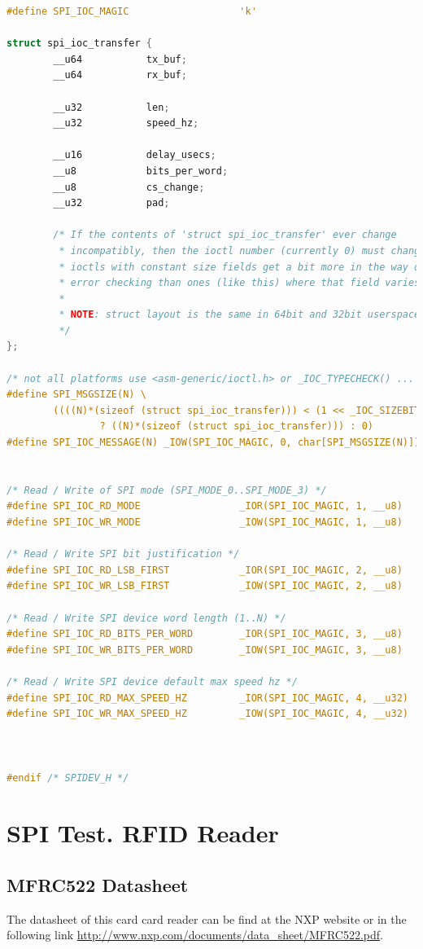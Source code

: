 \begin{lstlisting}[language=C, caption={linux/spi/spidev.h}]
#define SPI_IOC_MAGIC                   'k'

struct spi_ioc_transfer {
        __u64           tx_buf;
        __u64           rx_buf;

        __u32           len;
        __u32           speed_hz;

        __u16           delay_usecs;
        __u8            bits_per_word;
        __u8            cs_change;
        __u32           pad;

        /* If the contents of 'struct spi_ioc_transfer' ever change
         * incompatibly, then the ioctl number (currently 0) must change;
         * ioctls with constant size fields get a bit more in the way of
         * error checking than ones (like this) where that field varies.
         *
         * NOTE: struct layout is the same in 64bit and 32bit userspace.
         */
};

/* not all platforms use <asm-generic/ioctl.h> or _IOC_TYPECHECK() ... */
#define SPI_MSGSIZE(N) \
        ((((N)*(sizeof (struct spi_ioc_transfer))) < (1 << _IOC_SIZEBITS)) \
                ? ((N)*(sizeof (struct spi_ioc_transfer))) : 0)
#define SPI_IOC_MESSAGE(N) _IOW(SPI_IOC_MAGIC, 0, char[SPI_MSGSIZE(N)])


/* Read / Write of SPI mode (SPI_MODE_0..SPI_MODE_3) */
#define SPI_IOC_RD_MODE                 _IOR(SPI_IOC_MAGIC, 1, __u8)
#define SPI_IOC_WR_MODE                 _IOW(SPI_IOC_MAGIC, 1, __u8)

/* Read / Write SPI bit justification */
#define SPI_IOC_RD_LSB_FIRST            _IOR(SPI_IOC_MAGIC, 2, __u8)
#define SPI_IOC_WR_LSB_FIRST            _IOW(SPI_IOC_MAGIC, 2, __u8)

/* Read / Write SPI device word length (1..N) */
#define SPI_IOC_RD_BITS_PER_WORD        _IOR(SPI_IOC_MAGIC, 3, __u8)
#define SPI_IOC_WR_BITS_PER_WORD        _IOW(SPI_IOC_MAGIC, 3, __u8)

/* Read / Write SPI device default max speed hz */
#define SPI_IOC_RD_MAX_SPEED_HZ         _IOR(SPI_IOC_MAGIC, 4, __u32)
#define SPI_IOC_WR_MAX_SPEED_HZ         _IOW(SPI_IOC_MAGIC, 4, __u32)



#endif /* SPIDEV_H */
\end{lstlisting}

\section{SPI Test. RFID Reader}\label{S:linux-spi-spidev}
\subsection{MFRC522 Datasheet}\label{SS:Libs-MFRC522-Datasheet}
The datasheet of this card card reader can be find at the NXP website or in the following link \url{http://www.nxp.com/documents/data_sheet/MFRC522.pdf}.
\\

